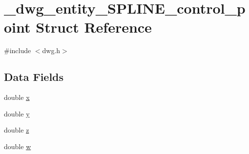 \hypertarget{struct__dwg__entity__SPLINE__control__point}{\section{\-\_\-dwg\-\_\-entity\-\_\-\-S\-P\-L\-I\-N\-E\-\_\-control\-\_\-point \-Struct \-Reference}
\label{struct__dwg__entity__SPLINE__control__point}
}


{\ttfamily \#include $<$dwg.\-h$>$}

\subsection*{\-Data \-Fields}
\begin{DoxyCompactItemize}
\item 
double \hyperlink{struct__dwg__entity__SPLINE__control__point_a8797665eae84bc46bb198238188314a6}{x}
\item 
double \hyperlink{struct__dwg__entity__SPLINE__control__point_a85f296460591d8803f19659233d4c2d7}{y}
\item 
double \hyperlink{struct__dwg__entity__SPLINE__control__point_a27e472c2af74fedbc587b371380ac7af}{z}
\item 
double \hyperlink{struct__dwg__entity__SPLINE__control__point_a754c2d0bb50d1ee35e10f3793f408f47}{w}
\end{DoxyCompactItemize}


